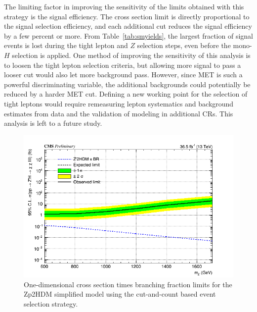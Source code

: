 The limiting factor in improving the sensitivity of the limits obtained with this strategy is the signal efficiency. The cross section limit is directly proportional to the signal selection efficiency, and each additional cut reduces the signal efficiency by a few percent or more. From Table~\ref{tab:smyields}, the largest fraction of signal events is lost during the tight lepton and $Z$ selection steps, even before the mono-$H$ selection is applied. One method of improving the sensitivity of this analysis is to loosen the tight lepton selection criteria, but allowing more signal to pass a looser cut would also let more background pass. However, since MET is such a powerful discriminating variable, the additional backgrounds could potentially be reduced by a harder MET cut. Defining a new working point for the selection of tight leptons would require remeasuring lepton systematics and background estimates from data and the validation of modeling in additional CRs. This analysis is left to a future study.

\begin{figure}[tbh]
\centering
\includegraphics[width=6in]{figures/sigma_limits_4mu_Zp2HDM.png}
\caption{One-dimensional cross section times branching fraction limits for the Zp2HDM simplified model using the cut-and-count based event selection strategy.}
\label{fig:limzp2hdm}
\end{figure}

